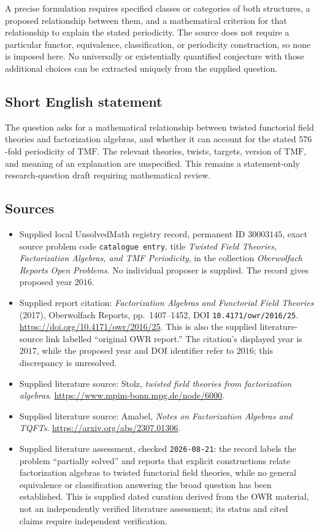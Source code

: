 \documentclass[11pt]{article}
\begin{document}
A precise formulation requires specified classes or categories of both structures, a proposed relationship between them, and a mathematical criterion for that relationship to explain the stated periodicity. The source does not require a particular functor, equivalence, classification, or periodicity construction, so none is imposed here. No universally or existentially quantified conjecture with those additional choices can be extracted uniquely from the supplied question.
\subsection{Short English statement}
The question asks for a mathematical relationship between twisted functorial field theories and factorization algebras, and whether it can account for the stated \(576\)-fold periodicity of \(\mathrm{TMF}\). The relevant theories, twists, targets, version of \(\mathrm{TMF}\), and meaning of an explanation are unspecified. This remains a statement-only research-question draft requiring mathematical review.
\subsection{Sources}
\begin{itemize}
\item Supplied local UnsolvedMath registry record, permanent ID \(30003145\), exact source problem code \texttt{catalogue entry}, title \emph{Twisted Field Theories, Factorization Algebras, and TMF Periodicity}, in the collection \emph{Oberwolfach Reports Open Problems}. No individual proposer is supplied. The record gives proposed year \(2016\).
\item Supplied report citation: \emph{Factorization Algebras and Functorial Field Theories} (2017), Oberwolfach Reports, pp.\ 1407--1452, DOI \texttt{10.4171/owr/2016/25}. \url{https://doi.org/10.4171/owr/2016/25}. This is also the supplied literature-source link labelled ``original OWR report.'' The citation's displayed year is \(2017\), while the proposed year and DOI identifier refer to \(2016\); this discrepancy is unresolved.
\item Supplied literature source: Stolz, \emph{twisted field theories from factorization algebras}. \url{https://www.mpim-bonn.mpg.de/node/6000}.
\item Supplied literature source: Amabel, \emph{Notes on Factorization Algebras and TQFTs}. \url{https://arxiv.org/abs/2307.01306}.
\item Supplied literature assessment, checked \texttt{2026-08-21}: the record labels the problem ``partially solved'' and reports that explicit constructions relate factorization algebras to twisted functorial field theories, while no general equivalence or classification answering the broad question has been established. This is supplied dated curation derived from the OWR material, not an independently verified literature assessment; its status and cited claims require independent verification.
\end{itemize}
\end{document}
